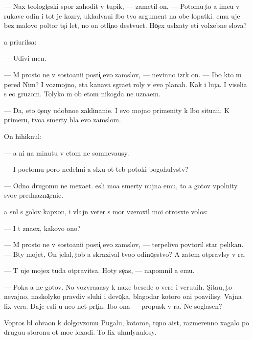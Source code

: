 \documentclass[10pt]{book}
\begin{document}
— Nax teologi{\c}eski{\y} spor zahodit v tupik, — zametil on. — Potomu {\c}to {\y}a ime{\y}u v rukave odin i tot je koz{\yi}ry, uklad{\yi}va{\y}u{\x}i{\y} l{\iu}bo{\y} tvo{\y} argument na obe lopatki. {\Y}emu uje bez malovo poltor{\yi} t{\yi}s{\ia}{\c}i let, no on otli{\c}no de{\y}stvu{\y}et. Ho{\c}ex usl{\yi}xaty eti volxebn{\yi}{\y}e slova?

{\Y}a pri{\x}urilsa:

— Udivi men{\ia}.

— M{\yi} prosto ne v sosto{\y}ani{\y}i posti{\c} {\Y}evo zam{\yi}slov, — nevinno izr{\e}k on. — Ibo kto m{\yi} pered Nim? I vozmojno, eta kanava s{\yi}gra{\y}et roly v {\Y}evo planah. Kak i luja. I viseli{\q}a s {\y}e{\y}o gruzom. Tolyko m{\yi} ob etom nikogda ne uzna{\y}em.

— Da, eto o{\c}eny udobno{\y}e zaklinani{\y}e. I {\y}evo mojno primenity k l{\iu}bo{\y} situa{\q}i{\y}i. K primeru, tvo{\y}a smerty b{\yi}la {\y}evo zam{\yi}slom.

On hihiknul:

— {\Y}a ni na minutu v etom ne somneva{\y}usy.

— I poetomu poro{\y} nedel{\ia}mi {\y}a sl{\yi}xu ot teb{\ia} potoki bogohulystv?

— Odno drugomu ne mexa{\y}et. {\Y}esli mo{\y}a smerty nujna {\Y}emu, to {\y}a gotov v{\yi}polnity svo{\y}e prednazna{\c}eni{\y}e.

{\Y}a sn{\ia}l s golov{\yi} kap{\iu}xon, i vlajn{\yi}{\y} veter s mor{\ia} vz{\y}eroxil mo{\y}i otrosxi{\y}e volos{\yi}:

— I t{\yi} zna{\y}ex, kakovo ono?

— M{\yi} prosto ne v sosto{\y}ani{\y}i posti{\c} {\Y}evo zam{\yi}slov, — terpelivo povtoril star{\yi}{\y} pelikan. — B{\yi}ty mojet, On jelal, {\c}tob{\yi} {\y}a skraxival tvo{\y}o odino{\c}estvo? A zatem otpravl{\iu}sy v ra{\y}.

— T{\yi} uje mojex tuda otpravitsa. Hoty se{\y}{\c}as, — napomnil {\y}a {\y}emu.

— Poka {\y}a ne gotov. No vozvra{\x}a{\y}asy k naxe{\y} besede o vere i veru{\y}u{\x}ih. S{\c}ita{\y}u, {\c}to nevajno, naskolyko pravdiv{\yi} sluhi i devo{\c}ka, blagodar{\ia} kotoro{\y} oni po{\y}avilisy. Vajna lix vera. Daje {\y}esli u ne{\y}o net pri{\c}in{\yi}. Ibo ona — propusk v ra{\y}. Ne soglasen?

Vopros b{\yi}l obra{\x}on k dolgov{\ia}zomu Pugalu, kotoro{\y}e, to{\c}no aist, razmerenno xagalo po drugu{\y}u storonu ot mo{\y}e{\y} loxadi. To lix uhm{\yi}lynulosy.
\end{document}
